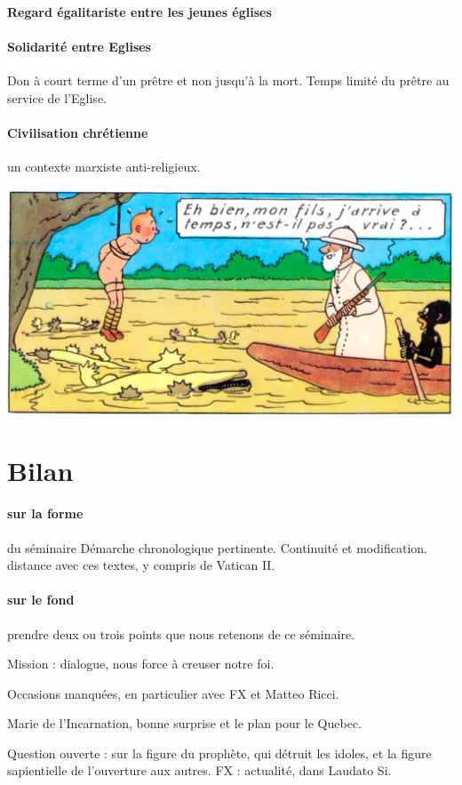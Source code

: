  \paragraph{Regard égalitariste entre les jeunes églises} 

 \paragraph{Solidarité entre Eglises} Don à court terme d'un prêtre et non jusqu'à la mort. Temps limité du prêtre au service de l'Eglise. 

\paragraph{Civilisation chrétienne}


un contexte marxiste anti-religieux.


  \includegraphics[width=\textwidth]{SeminaireMission/images/TintinCongo3.jpg}  


 
\section{Bilan}

\paragraph{sur la forme} du séminaire
Démarche chronologique pertinente. Continuité et modification.
distance avec ces textes, y compris de Vatican II.

\paragraph{sur le fond} prendre deux ou trois points que nous retenons de ce séminaire.

Mission : dialogue, nous force à creuser notre foi.

Occasions manquées, en particulier avec FX et Matteo Ricci.

Marie de l'Incarnation, bonne surprise et le plan pour le Quebec.

Question ouverte : sur la figure du prophète, qui détruit les idoles, et la figure sapientielle de l'ouverture aux autres. FX : actualité, dans Laudato Si.  




